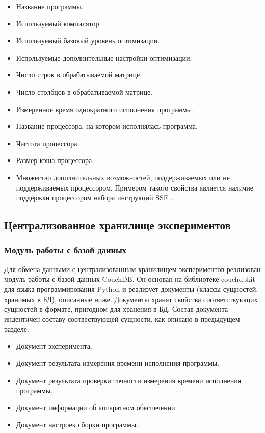 \begin{itemize}
	\item Название программы.
	\item Используемый компилятор.
	\item Используемый базовый уровень оптимизации.
	\item Используемые дополнительные настройки оптимизации.
	\item Число строк в обрабатываемой матрице.
	\item Число столбцов в обрабатываемой матрице.
	\item Измеренное время однократного исполнения программы.
	\item Название процессора, на котором исполнялась программа.
	\item Частота процессора.
	\item Размер кэша процессора.
	\item Множество дополнительных возможностей, поддерживаемых или не поддерживаемых процессором. Примером такого свойства является наличие поддержки процессором набора инструкций SSE \cite{sse}.
\end{itemize}

\subsection{Централизованное хранилище экспериментов}

\subsubsection{Модуль работы с базой данных}

Для обмена данными с централизованным хранилищем экспериментов реализован модуль работы с базой данных CouchDB. Он основан на библиотеке couchdbkit \cite{couchdbkit} для языка программирования Python и реализует документы (классы сущностей, хранимых в БД), описанные ниже. Документы хранят свойства соответствующих сущностей в формате, пригодном для хранения в БД. Состав документа индентичен составу соотвествующей сущности, как описано в предыдущем разделе.

\begin{itemize}

\item Документ эксперимента.
\item Документ результата измерения времени исполнения программы.
\item Документ результата проверки точности измерения времени исполнения программы.
\item Документ информации об аппаратном обеспечении.
\item Документ настроек сборки программы.

\end{itemize}

